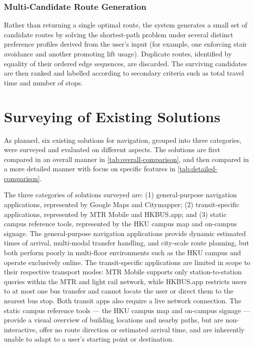 \documentclass[a4paper,10pt]{amsart}
\begin{document}
\subsubsection{Multi-Candidate Route Generation}

Rather than returning a single optimal route, the system generates a small set of candidate routes by solving the shortest-path problem under several distinct preference profiles derived from the user's input (for example, one enforcing stair avoidance and another promoting lift usage).
Duplicate routes, identified by equality of their ordered edge sequences, are discarded.
The surviving candidates are then ranked and labelled according to secondary criteria such as total travel time and number of stops.

\section{Surveying of Existing Solutions}

As planned, six existing solutions for navigation, grouped into three categories, were surveyed and evaluated on different aspects.
The solutions are first compared in an overall manner in \autoref{tab:overall-comparison}, and then compared in a more detailed manner with focus on specific features in \autoref{tab:detailed-comparison}.

The three categories of solutions surveyed are: (1) general-purpose navigation applications, represented by Google Maps and Citymapper; (2) transit-specific applications, represented by MTR Mobile and HKBUS.app; and (3) static campus reference tools, represented by the HKU campus map and on-campus signage.
The general-purpose navigation applications provide dynamic estimated times of arrival, multi-modal transfer handling, and city-scale route planning, but both perform poorly in multi-floor environments such as the HKU campus and operate exclusively online.
The transit-specific applications are limited in scope to their respective transport modes: MTR Mobile supports only station-to-station queries within the MTR and light rail network, while HKBUS.app restricts users to at most one bus transfer and cannot locate the user or direct them to the nearest bus stop.
Both transit apps also require a live network connection.
The static campus reference tools --- the HKU campus map and on-campus signage --- provide a visual overview of building locations and nearby paths, but are non-interactive, offer no route direction or estimated arrival time, and are inherently unable to adapt to a user's starting point or destination.
\end{document}
